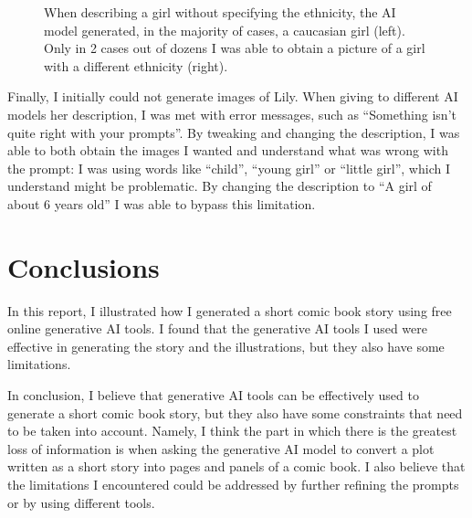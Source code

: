 \documentclass[a4paper,11pt]{article}
\begin{document}
\begin{figure}
    \caption{When describing a girl without specifying the ethnicity, the AI model generated, in the majority of cases, a caucasian girl (left). Only in 2 cases out of dozens I was able to obtain a picture of a girl with a different ethnicity (right).}
    \label{fig:bias}
\end{figure}

Finally, I initially could not generate images of Lily. When giving to different AI models her description, I was met with error messages, such as ``Something isn't quite right with your prompts''. By tweaking and changing the description, I was able to both obtain the images I wanted and understand what was wrong with the prompt: I was using words like ``child'', ``young girl'' or ``little girl'', which I understand might be problematic. By changing the description to ``A girl of about 6 years old'' I was able to bypass this limitation.



\section{Conclusions}
In this report, I illustrated how I generated a short comic book story using free online generative AI tools. I found that the generative AI tools I used were effective in generating the story and the illustrations, but they also have some limitations.

In conclusion, I believe that generative AI tools can be effectively used to generate a short comic book story, but they also have some constraints that need to be taken into account. Namely, I think the part in which there is the greatest loss of information is when asking the generative AI model to convert a plot written as a short story into pages and panels of a comic book. I also believe that the limitations I encountered could be addressed by further refining the prompts or by using different tools. 




\newpage
\appendix




\newpage



\newpage 
 
 
\end{document}
